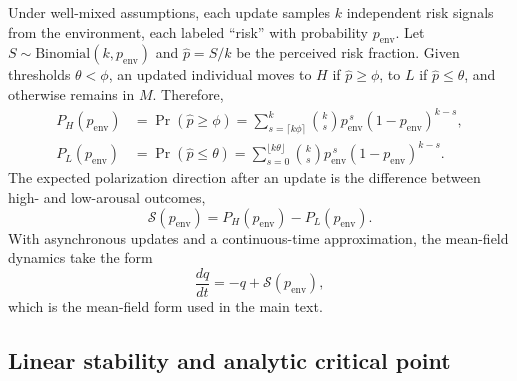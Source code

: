 \documentclass[11pt]{article}
\begin{document}
Under well-mixed assumptions, each update samples $k$ independent risk signals from the environment, each labeled ``risk'' with probability $p_{\text{env}}$. Let $S\sim\text{Binomial}(k,p_{\text{env}})$ and $\hat{p}=S/k$ be the perceived risk fraction. Given thresholds $\theta<\phi$, an updated individual moves to $H$ if $\hat{p}\ge \phi$, to $L$ if $\hat{p}\le \theta$, and otherwise remains in $M$. Therefore,
\begin{align}
P_H(p_{\text{env}}) &= \Pr(\hat{p}\ge \phi)=\sum_{s=\lceil k\phi\rceil}^{k}\binom{k}{s}p_{\text{env}}^{\,s}(1-p_{\text{env}})^{k-s},\\
P_L(p_{\text{env}}) &= \Pr(\hat{p}\le \theta)=\sum_{s=0}^{\lfloor k\theta\rfloor}\binom{k}{s}p_{\text{env}}^{\,s}(1-p_{\text{env}})^{k-s}.
\end{align}
The expected polarization direction after an update is the difference between high- and low-arousal outcomes,
\begin{equation}
\mathcal{S}(p_{\text{env}})=P_H(p_{\text{env}})-P_L(p_{\text{env}}).
\end{equation}
With asynchronous updates and a continuous-time approximation, the mean-field dynamics take the form
\begin{equation}
\frac{dq}{dt}=-q+\mathcal{S}(p_{\text{env}}),
\end{equation}
which is the mean-field form used in the main text.

\subsection{Linear stability and analytic critical point}
\end{document}
